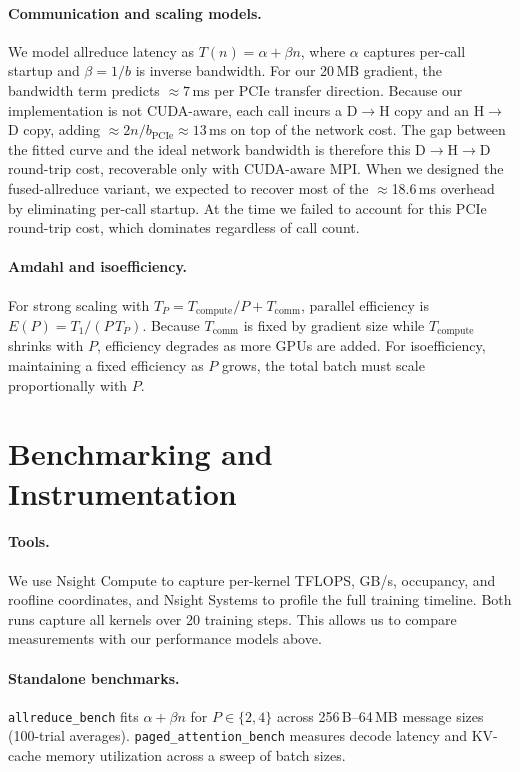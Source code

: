 \documentclass[11pt,letterpaper]{article}
\begin{document}
\paragraph{Communication and scaling models.}
We model allreduce latency as $T(n) = \alpha + \beta n$, where $\alpha$ captures
per-call startup and $\beta = 1/b$ is inverse bandwidth.
For our 20\,MB gradient, the bandwidth term predicts $\approx 7$\,ms per PCIe
transfer direction. Because our implementation is not CUDA-aware, each call
incurs a D$\to$H copy and an H$\to$D copy, adding $\approx 2n/b_\text{PCIe}
\approx 13$\,ms on top of the network cost.
The gap between the fitted curve and the ideal network bandwidth is therefore
this D$\to$H$\to$D round-trip cost, recoverable only with CUDA-aware MPI.
When we designed the fused-allreduce variant, we expected to recover most of the $\approx$18.6\,ms overhead by eliminating per-call startup. At the time we failed to account for this PCIe round-trip cost, which dominates regardless of call count.


\paragraph{Amdahl and isoefficiency.}
For strong scaling with $T_P = T_\text{compute}/P + T_\text{comm}$, parallel
efficiency is $E(P) = T_1/(P\,T_P)$. Because $T_\text{comm}$ is fixed by
gradient size while $T_\text{compute}$ shrinks with $P$, efficiency degrades as
more GPUs are added. For isoefficiency, maintaining a fixed efficiency as $P$
grows, the total batch must scale proportionally with $P$.

\section{Benchmarking and Instrumentation}\label{sec:bench}

\paragraph{Tools.}
We use Nsight Compute to capture per-kernel
TFLOPS, GB/s, occupancy, and roofline coordinates, and Nsight Systems
to profile the full training timeline. Both runs capture all kernels
over 20 training steps. This allows us to compare measurements with our performance models above. 

\paragraph{Standalone benchmarks.}
\texttt{allreduce\_bench} fits $\alpha{+}\beta n$ for $P\in\{2,4\}$ across
256\,B--64\,MB message sizes (100-trial averages).
\texttt{paged\_attention\_bench} measures decode latency and KV-cache memory utilization across a sweep of batch sizes.
\end{document}
